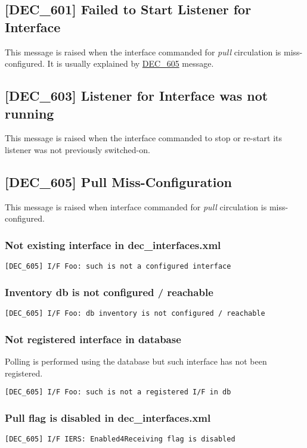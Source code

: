 \documentclass[dec_sum_main.tex]{subfiles}
\begin{document}
\label{DEC601}
\subsection{[DEC\_601] Failed to Start Listener for Interface}
This message is raised when the interface commanded for \textit{pull} circulation is miss-configured. It is usually explained by \hyperref[DEC605]{DEC\_605} message. 

\label{DEC603}
\subsection{[DEC\_603] Listener for Interface was not running}
This message is raised when the interface commanded to stop or re-start its listener was not previously switched-on.

\label{DEC605}
\subsection{[DEC\_605] Pull Miss-Configuration}
This message is raised when interface commanded for \textit{pull} circulation is miss-configured.

\subsubsection{Not existing interface in dec\_interfaces.xml }
\begin{verbatim}
[DEC_605] I/F Foo: such is not a configured interface
\end{verbatim}

\subsubsection{Inventory db is not configured / reachable }
\begin{verbatim}
[DEC_605] I/F Foo: db inventory is not configured / reachable
\end{verbatim}

\subsubsection{Not registered interface in database }
Polling is performed using the database but such interface has not been registered.
\begin{verbatim}
[DEC_605] I/F Foo: such is not a registered I/F in db
\end{verbatim}

\subsubsection{Pull flag is disabled in  dec\_interfaces.xml }
\begin{verbatim}
[DEC_605] I/F IERS: Enabled4Receiving flag is disabled
\end{verbatim}
\end{document}
